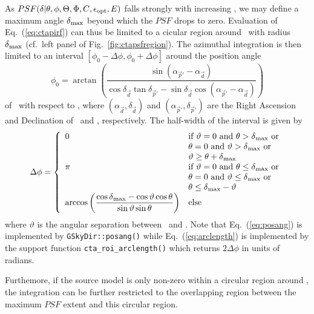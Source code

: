 \documentclass{article}[12pt,a4]
\begin{document}
As $PSF(\mbox{$\delta$} | \mbox{$\theta$}, \mbox{$\phi$}, \mbox{$\Theta$}, \mbox{$\Phi$}, \mbox{$C$}, \mbox{$\epsilon_{\rm opt}$}, E)$ falls strongly with increasing
\psfsep, we may define a maximum angle $\mbox{$\delta$}_{\rm max}$ beyond
which the $PSF$ drops to zero.
Evaluation of Eq.~(\ref{eq:ctapirf}) can thus be limited to a cicular region around
\phdir\ with radius $\mbox{$\delta$}_{\rm max}$ (cf.~left panel of Fig.~\ref{fig:ctapsfregion}).
The azimuthal integration is then limited to an interval 
$[\phi_0 - \Delta \phi, \phi_0 + \Delta \phi]$ around the position angle
\begin{equation}
\phi_0 = \arctan \left( 
\frac{\sin( \alpha_{\vec{p}'} - \alpha_{\vec{d}} )}
        {\cos \delta_{\vec{d}} \tan \delta_{\vec{p}'} - 
         \sin \delta_{\vec{d}} \cos( \alpha_{\vec{p}'} - \alpha_{\vec{d}} )}
\right)
\label{eq:posang}
\end{equation}
of \phdir\ with respect to \teldir, where
$(\alpha_{\vec{d}}, \delta_{\vec{d}})$ and
$(\alpha_{\vec{p}'}, \delta_{\vec{p}'})$ are the Right Ascension and Declination of
\teldir\ and \phdir, respectively.
The half-width of the interval is given by
\begin{equation}
\Delta \phi = \left \{
\begin{array}{l l}
\displaystyle
0 & \mbox{if $\vartheta = 0$ and $\mbox{$\theta$} > \mbox{$\delta$}_{\rm max}$ or} \\
& \mbox{$\mbox{$\theta$} = 0$ and $\vartheta > \mbox{$\delta$}_{\rm max}$ or} \\
& \mbox{$\vartheta \ge \mbox{$\theta$} + \mbox{$\delta$}_{\rm max}$} \\
\pi & \mbox{if $\vartheta = 0$ and $\mbox{$\theta$} \le \mbox{$\delta$}_{\rm max}$ or} \\
& \mbox{$\mbox{$\theta$} = 0$ and $\vartheta \le \mbox{$\delta$}_{\rm max}$ or} \\
& \mbox{$\mbox{$\theta$} \le \mbox{$\delta$}_{\rm max}-\vartheta$} \\
\displaystyle
\arccos \left ( 
\frac{\cos \mbox{$\delta$}_{\rm max} - \cos \vartheta \cos \mbox{$\theta$}}
        {\sin \vartheta \sin \mbox{$\theta$}} 
\right) & \mbox{else}
\end{array}
\right.
\label{eq:arclength}
\end{equation}
where
$\vartheta$ is the angular separation between \teldir\ and \phdir.
Note that 
Eq.~(\ref{eq:posang}) is implemented by {\tt GSkyDir::posang()}
while
Eq.~(\ref{eq:arclength}) is implemented by the support function
{\tt cta\_roi\_arclength()} which returns $2 \Delta \phi$ in units of radians.

Furthemore, if the source model is only non-zero within a circular region around
\srcdir, the integration can be further restricted to the overlapping region between
the maximum $PSF$ extent and this circular region.
\end{document}
